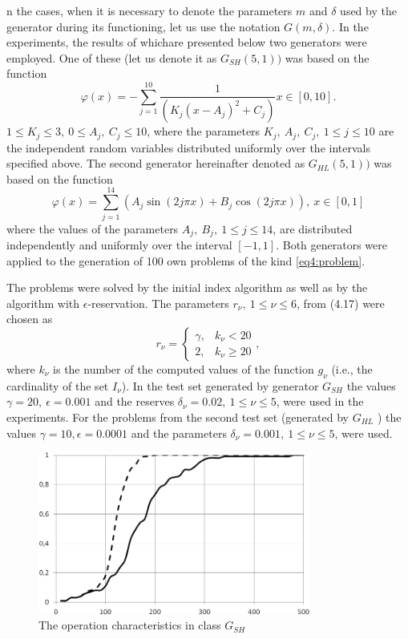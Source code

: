 \documentclass[graybox]{svmult}
\begin{document}
n the cases, when it is necessary to denote the parameters $m$ and $\delta$ used by the generator during its functioning, let us use the notation $G ( m , \delta )$. In the experiments, the results of whichare presented below two generators were employed. One of these (let us denote it as $G_{SH} ( 5 , 1 ) )$ was based on the function
\begin{displaymath}
  \varphi(x)=-\sum_{j=1}^{10}\frac{1}{(K_j(x-A_j)^2+C_j)}x\in[0,10].
\end{displaymath}
$1\le K_j\le 3,\: 0\le A_j,\: C_j\le 10 $, where the parameters $K_j,\: A_j,\: C_j ,\: 1 \le j \le 10$ are the independent random variables distributed uniformly over the intervals specified above. The second generator hereinafter denoted as $G_{HL} ( 5 , 1 ) )$ was based on the function
\begin{equation}
  \varphi(x)=\sum_{j=1}^{14}(A_j\sin(2j\pi x) + B_j\cos(2j\pi x)),\: x\in[0,1]
\end{equation}
where the values of the parameters $A_j,\: B_j,\: 1 \le j \le 14$, are distributed independently and uniformly over the interval $[-1 ,1 ]$. Both generators were applied to the generation of 100 own
problems of the kind \eqref{eq4:problem}.

The problems were solved by the initial index algorithm as well as by the algorithm with $\epsilon$-reservation. The parameters $r_\nu ,\: 1 \le \nu \le 6$, from (4.17) were chosen as
\begin{displaymath}
  r_\nu = \left\{
  \begin{array}{lr}
    \gamma, & k_\nu < 20\\
    2, & k_\nu \ge 20
  \end{array}
  \right.,
\end{displaymath}
where $k_\nu$ is the number of the computed values of the function $g_\nu$ (i.e., the cardinality of the set $I_\nu$). In the test set generated by generator $G_{SH}$ the values $\gamma=20,\: \epsilon = 0.001$ and the reserves $\delta_\nu=0.02,\: 1 \le \nu \le 5$, were used in the experiments. For the problems from the second test set
(generated by $G_{HL}$ ) the values $\gamma = 10, \epsilon=0.0001$ and the parameters $\delta_\nu=0.001,\: 1 \le \nu\le 5$, were used.

\begin{figure}[h]
  \label{fig:4_9}
  \centering
  \includegraphics[width=0.8\textwidth]{figures/4_9.png}
  \caption{The operation characteristics in class $G_{SH}$}
\end{figure}
\end{document}
